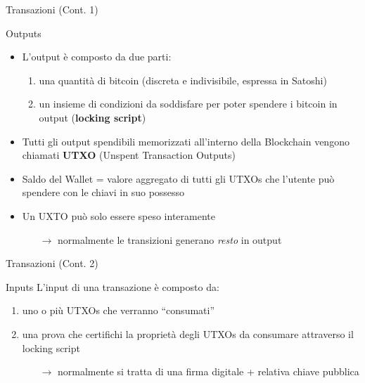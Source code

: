\documentclass{beamer}
\begin{document}
  \begin{frame}{Transazioni (Cont. 1)}
    \begin{block}{Outputs}
      \begin{itemize}
        \item L'output è composto da due parti:
        \begin{enumerate}
          \item una quantità di bitcoin (discreta e indivisibile, espressa in Satoshi) 
          \item un insieme di condizioni da soddisfare per poter spendere i bitcoin in output (\textbf{locking script})
        \end{enumerate}
        \pause
        \item Tutti gli output spendibili memorizzati all'interno della Blockchain vengono chiamati \textbf{UTXO} (Unspent Transaction Outputs)
        \item Saldo del Wallet = valore aggregato di tutti gli UTXOs che l'utente può spendere con le chiavi in suo possesso 
        \item Un UXTO può solo essere speso interamente
        \begin{itemize}
          \item[$\rightarrow$] normalmente le transizioni generano \emph{resto} in output
        \end{itemize}
      \end{itemize}
    \end{block}
  \end{frame}





  \begin{frame}{Transazioni (Cont. 2)}
    \begin{block}{Inputs}
      L'input di una transazione è composto da: 
      \begin{enumerate}
        \item uno o più UTXOs che verranno ``consumati''
        \item una prova che certifichi la proprietà degli UTXOs da consumare attraverso il locking script 
        \begin{itemize}
          \item[$\rightarrow$] normalmente si tratta di una firma digitale + relativa chiave pubblica 
        \end{itemize}
      \end{enumerate}
    \end{block}
  \end{frame}
  
\end{document}
